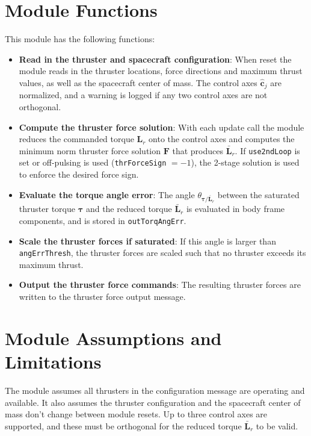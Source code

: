 

\section{Module Functions}
This module has the following functions:
\begin{itemize}
	\item \textbf{Read in the thruster and spacecraft configuration}: When reset the module reads in the thruster locations, force directions and maximum thrust values, as well as the spacecraft center of mass.  The control axes $\hat{\bm c}_{j}$ are normalized, and a warning is logged if any two control axes are not orthogonal.
	\item \textbf{Compute the thruster force solution}: With each update call the module reduces the commanded torque $\bm L_{r}$ onto the control axes and computes the minimum norm thruster force solution $\bm F$ that produces $\bar{\bm L}_{r}$.  If {\tt use2ndLoop} is set or off-pulsing is used ({\tt thrForceSign} $= -1$), the 2-stage solution is used to enforce the desired force sign.
	\item \textbf{Evaluate the torque angle error}: The angle $\theta_{\bm\tau/\bar{\bm L}_{r}}$ between the saturated thruster torque $\bm\tau$ and the reduced torque $\bar{\bm L}_{r}$ is evaluated in body frame components, and is stored in {\tt outTorqAngErr}.
	\item \textbf{Scale the thruster forces if saturated}: If this angle is larger than {\tt angErrThresh}, the thruster forces are scaled such that no thruster exceeds its maximum thrust.
	\item \textbf{Output the thruster force commands}: The resulting thruster forces are written to the thruster force output message.
\end{itemize}

\section{Module Assumptions and Limitations}
The module assumes all thrusters in the configuration message are operating and available.  It also assumes the thruster configuration and the spacecraft center of mass don't change between module resets.  Up to three control axes are supported, and these must be orthogonal for the reduced torque $\bar{\bm L}_{r}$ to be valid.
